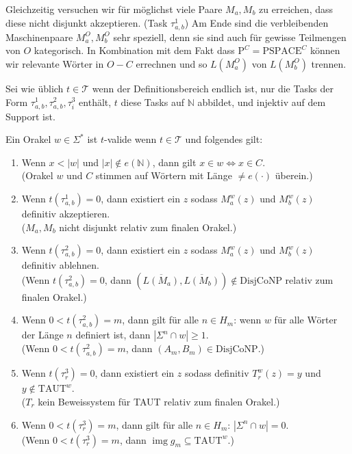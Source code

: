 \documentclass[nofonts]{uebung}
\def\P{\ensuremath{\mathrm{P}}}
\def\DisjCoNP{\ensuremath{\mathrm{DisjCoNP}}}
\def\TAUT{\ensuremath{\mathrm{TAUT}}}
\DeclareMathOperator{\img}{img}
\begin{document}
Gleichzeitig versuchen wir für möglichst viele Paare $M_a, M_b$ zu erreichen, dass diese nicht disjunkt akzeptieren. (Task $\tau^1_{a,b}$)
Am Ende sind die verbleibenden Maschinenpaare $M_a^O, M_b^O$ sehr speziell, denn sie sind auch für gewisse Teilmengen von $O$ kategorisch.
In Kombination mit dem Fakt dass $\P^C=\mathrm{PSPACE}^C$ können wir relevante Wörter in $O-C$ errechnen und so $L(M_a^O)$ von $L(M_b^O)$ trennen.
\medskip

Sei wie üblich $t\in \mathcal T$ wenn der Definitionsbereich endlich ist, nur die Tasks der Form $\tau^1_{a,b}, \tau^2_{a,b}, \tau^3_i$ enthält, $t$ diese Tasks auf $\mathbb N$ abbildet, und injektiv auf dem Support ist.

Ein Orakel $w\in\Sigma^*$ ist $t$-valide wenn $t\in\mathcal T$ und folgendes gilt:
\begin{enumerate}[label={V\arabic*}]
    \item Wenn $x<|w|$ und $|x|\not\in e(\mathbb N)$, dann gilt $x\in w\iff x\in C$.\\
        (Orakel $w$ und $C$ stimmen auf Wörtern mit Länge $\neq e(\cdot)$ überein.)
    \item Wenn $t(\tau^1_{a,b})=0$, dann existiert ein $z$ sodass $M_a^w(z)$ und $M_b^w(z)$ definitiv akzeptieren.\\
        ($M_a, M_b$ nicht disjunkt relativ zum finalen Orakel.)
    \item Wenn $t(\tau^2_{a,b})=0$, dann existiert ein $z$ sodass $M_a^w(z)$ und $M_b^w(z)$ definitiv ablehnen.\\
        (Wenn $t(\tau^2_{a,b})=0$, dann $(\overline{L(M_a)}, \overline{ L(M_b)})\not\in \DisjCoNP$ relativ zum finalen Orakel.)
    \item Wenn $0<t(\tau^2_{a,b})=m$, dann gilt für alle $n\in H_m$: wenn $w$ für alle Wörter der Länge $n$ definiert ist, dann $|\Sigma^n\cap w|\geq 1$.\\
        (Wenn $0<t(\tau^2_{a,b})=m$, dann $(A_m,B_m)\in\DisjCoNP$.)
    \item Wenn $t(\tau^3_{r})=0$, dann existiert ein $z$ sodass definitiv $T_r^w(z)=y$ und $y\not\in\TAUT^w$.\\
        ($T_r$ kein Beweissystem für TAUT relativ zum finalen Orakel.)
    \item Wenn $0<t(\tau^3_{r})=m$, dann gilt für alle $n\in H_m$: $|\Sigma^n\cap w|=0$.\\
        (Wenn $0<t(\tau^3_{r})=m$, dann $\img g_m \subseteq \TAUT^w$.)
\end{enumerate}
\end{document}
